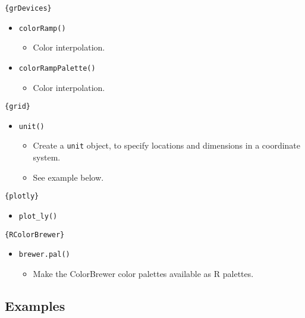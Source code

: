 \documentclass[
]{book}
\providecommand{\tightlist}{%
  \setlength{\itemsep}{0pt}\setlength{\parskip}{0pt}}
\begin{document}
\texttt{\{grDevices\}}

\begin{itemize}
\tightlist
\item
  \texttt{colorRamp()}

  \begin{itemize}
  \tightlist
  \item
    Color interpolation.
  \end{itemize}
\item
  \texttt{colorRampPalette()}

  \begin{itemize}
  \tightlist
  \item
    Color interpolation.
  \end{itemize}
\end{itemize}

\texttt{\{grid\}}

\begin{itemize}
\tightlist
\item
  \texttt{unit()}

  \begin{itemize}
  \tightlist
  \item
    Create a \texttt{unit} object, to specify locations and dimensions in a coordinate system.
  \item
    See example below.
  \end{itemize}
\end{itemize}

\texttt{\{plotly\}}

\begin{itemize}
\tightlist
\item
  \texttt{plot\_ly()}
\end{itemize}

\texttt{\{RColorBrewer\}}

\begin{itemize}
\tightlist
\item
  \texttt{brewer.pal()}

  \begin{itemize}
  \tightlist
  \item
    Make the ColorBrewer color palettes available as R palettes.
  \end{itemize}
\end{itemize}

\hypertarget{examples-5}{%
\subsection{Examples}\label{examples-5}}
\end{document}
